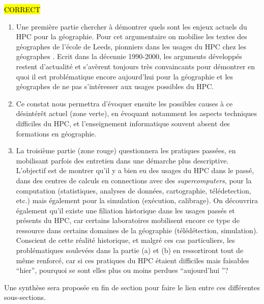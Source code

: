 \hl{CORRECT}
\begin{enumerate}[label=(\alph*),labelindent=\parindent,leftmargin=*]
\item Une première partie chercher à démontrer quels sont les enjeux actuels du HPC pour la géographie. Pour cet argumentaire on mobilise les textes des  géographes de l'école de Leeds, pionniers dans les usages du HPC chez les géographes \textcite{Openshaw2000b}. Ecrit dans la décennie 1990-2000, les arguments développés restent d'actualité et s'avèrent toujours très convaincants pour démontrer en quoi il est problématique encore aujourd'hui pour la géographie et les géographes de ne pas s'intéresser aux usages possibles du HPC.
\item Ce constat nous permettra d'évoquer ensuite les possibles causes à ce désintérêt actuel (zone verte), en évoquant notamment les aspects techniques difficiles du HPC, et l'enseignement informatique souvent absent des formations en géographie.
\item La troisième partie (zone rouge) questionnera les pratiques passées, en mobilisant parfois des entretien dans une démarche plus descriptive. L'objectif est de montrer qu'il y a bien eu des usages du HPC dans le passé, dans des centres de calculs en connections avec des \textit{supercomputers}, pour la computation (statistiques, analyses de données, cartographie, télédetection, etc.) mais également pour la simulation (exécution, calibrage). On découvrira également qu'il existe une filiation historique dans les usages passés et présents du HPC, car certains laboratoires mobilisent encore ce type de ressource dans certains domaines de la géographie (télédétection, simulation). Conscient de cette réalité historique, et malgré ces cas particuliers, les problématiques soulevées dans la partie (a) et (b) en ressortiront tout de même renforcé, car si ces pratiques du HPC étaient difficiles mais faisables \enquote{hier}, pourquoi se sont elles plus ou moins perdues \enquote{aujourd'hui }?
\end{enumerate}

Une synthèse sera proposée en fin de section pour faire le lien entre ces différentes sous-sections.



